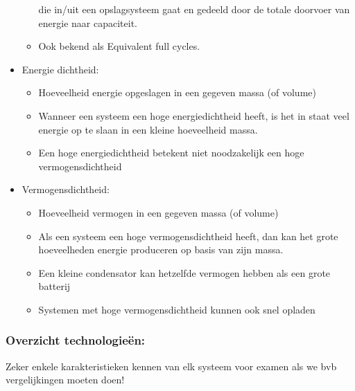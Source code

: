 \documentclass[12pt]{article}
\begin{document}
\begin{itemize}
\begin{itemize}
        die in/uit een opslagsysteem gaat en gedeeld door de totale doorvoer
        van energie naar capaciteit.
        \item Ook bekend als Equivalent full cycles.
    \end{itemize}
    \item Energie dichtheid:\begin{itemize}
        \item Hoeveelheid energie opgeslagen in een gegeven massa (of volume) 
        \item Wanneer een systeem een hoge energiedichtheid heeft, is het in staat veel energie op
        te slaan in een kleine hoeveelheid massa. 
        \item Een hoge energiedichtheid betekent niet noodzakelijk een hoge vermogensdichtheid
    \end{itemize}
    \item Vermogensdichtheid:\begin{itemize}
        \item Hoeveelheid vermogen in een gegeven massa (of volume) 
        \item Als een systeem een hoge vermogensdichtheid heeft, dan kan het grote hoeveelheden
        energie produceren op basis van zijn massa. 
        \item Een kleine condensator kan hetzelfde vermogen hebben als een grote batterij 
        \item Systemen met hoge vermogensdichtheid kunnen ook snel opladen
    \end{itemize}
\end{itemize}
\subsubsection{Overzicht technologieën:}
Zeker enkele karakteristieken kennen van elk systeem voor examen als we bvb vergelijkingen moeten doen!
\end{document}
